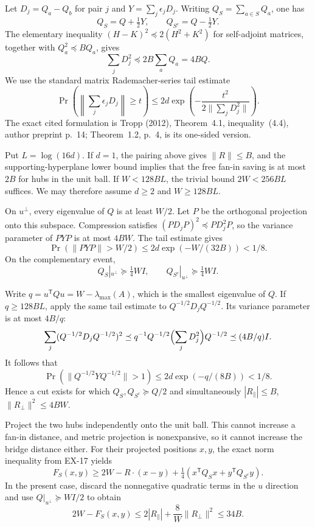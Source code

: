 Let $D_j=Q_a-Q_b$ for pair $j$ and $Y=\sum_j\epsilon_jD_j$.
Writing $Q_S=\sum_{a\in S}Q_a$, one has
\[
 Q_S=Q+\tfrac12Y,\qquad Q_{S^c}=Q-\tfrac12Y.
\]
The elementary inequality $(H-K)^2\preceq2(H^2+K^2)$ for self-adjoint
matrices, together with $Q_a^2\preceq BQ_a$, gives
\[
 \sum_jD_j^2\preceq2B\sum_aQ_a=4BQ.
\]
We use the standard matrix Rademacher-series tail estimate
\[
 \Pr\!\left(\left\|\sum_j\epsilon_jD_j\right\|\geq t\right)
 \leq2d\exp\!\left(-\frac{t^2}{2\|\sum_jD_j^2\|}\right).
\]
The exact cited formulation is Tropp (2012), Theorem~4.1,
inequality~(4.4), author preprint p.~14; Theorem~1.2, p.~4,
is its one-sided version.

Put $L=\log(16d)$.  If $d=1$, the pairing above gives $\|R\|\leq B$,
and the supporting-hyperplane lower bound implies that the free fan-in
saving is at most $2B$ for hubs in the unit ball.  If $W<128BL$, the
trivial bound $2W<256BL$ suffices.  We may therefore assume $d\geq2$
and $W\geq128BL$.

On $u^\perp$, every eigenvalue of $Q$ is at least $W/2$.
Let $P$ be the orthogonal projection onto this subspace.
Compression satisfies $(PD_jP)^2\preceq PD_j^2P$, so the variance
parameter of $PYP$ is at most $4BW$.  The tail estimate gives
\[
 \Pr(\|PYP\|>W/2)
 \leq2d\exp(-W/(32B))<1/8.
\]
On the complementary event,
\[
 Q_S|_{u^\perp}\succeq\tfrac14WI,\qquad
 Q_{S^c}|_{u^\perp}\succeq\tfrac14WI.
\]

Write $q=u^{\mathsf T}Qu=W-\lambda_{\max}(A)$, which is the smallest
eigenvalue of $Q$.  If $q\geq128BL$, apply the same tail estimate to
$Q^{-1/2}D_jQ^{-1/2}$.  Its variance parameter is at most $4B/q$:
\[
 \sum_j(Q^{-1/2}D_jQ^{-1/2})^2
 \preceq q^{-1}Q^{-1/2}\Bigl(\sum_jD_j^2\Bigr)Q^{-1/2}
 \preceq(4B/q)I.
\]
It follows that
\[
 \Pr(\|Q^{-1/2}YQ^{-1/2}\|>1)
 \leq2d\exp(-q/(8B))<1/8.
\]
Hence a cut exists for which
$Q_S,Q_{S^c}\succeq Q/2$ and simultaneously
$|R_\parallel|\leq B$, $\|R_\perp\|^2\leq4BW$.

Project the two hubs independently onto the unit ball.  This cannot
increase a fan-in distance, and metric projection is nonexpansive, so
it cannot increase the bridge distance either.  For their projected
positions $x,y$, the exact norm inequality from EX-17 yields
\[
 F_S(x,y)\geq2W-R\cdot(x-y)
       +\tfrac14(x^{\mathsf T}Q_Sx+y^{\mathsf T}Q_{S^c}y).
\]
In the present case, discard the nonnegative quadratic terms in the
$u$ direction and use $Q|_{u^\perp}\succeq WI/2$ to obtain
\[
 2W-F_S(x,y)
 \leq2|R_\parallel|+\frac8W\|R_\perp\|^2
 \leq34B.
\]

